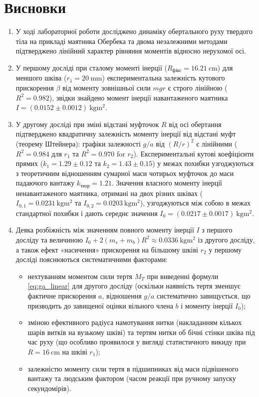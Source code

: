 \documentclass[ukrainian]{ucaphyslab}
\begin{document}
\section{Висновки}
\begin{enumerate}
  \item У ході лабораторної роботи досліджено динаміку обертального руху твердого тіла на прикладі маятника Обербека та двома незалежними методами підтверджено лінійний характер рівняння моментів відносно нерухомої осі.
  \item У першому досліді при сталому моменті інерції ($R_{\text{фікс}} = \SI{16.21}{\centi\meter}$) для меншого шківа ($r_1 = \SI{20}{\milli\meter}$) експериментальна залежність кутового прискорення $\beta$ від моменту зовнішньої сили $mgr$ є строго лінійною ($R^2 = 0.982$), звідки знайдено момент інерції навантаженого маятника $I = (\num{0.0152} \pm \num{0.0012})\ \si{\kilogram\meter\squared}$.
  \item У другому досліді при зміні відстані муфточок $R$ від осі обертання підтверджено квадратичну залежність моменту інерції від відстані муфт (теорему Штейнера): графіки залежності $g/a$ від $(R/r)^2$ є лінійними ($R^2 = 0.984$ для $r_1$ та $R^2 = 0.970$ for $r_2$). Експериментальні кутові коефіцієнти прямих ($k_1 = 1.29 \pm 0.12$ та $k_2 = 1.43 \pm 0.15$) у межах похибки узгоджуються з теоретичним відношенням сумарної маси чотирьох муфточок до маси падаючого вантажу $k_{\text{теор}} = 1.21$. Значення власного моменту інерції ненавантаженого маятника, отримані на двох різних шківах ($I_{0,1} = \SI{0.0231}{\kilogram\meter\squared}$ та $I_{0,2} = \SI{0.0203}{\kilogram\meter\squared}$), узгоджуються між собою в межах стандартної похибки і дають середнє значення $I_0 = (\num{0.0217} \pm \num{0.0017})\ \si{\kilogram\meter\squared}$.
  \item Деяка розбіжність між значенням повного моменту інерції $I$ з першого досліду та величиною $I_0 + 2(m_s+m_b)R^2 \approx \SI{0.0336}{\kilogram\meter\squared}$ із другого досліду, а також ефект «насичення» прискорення на більшому шківі $r_2$ у першому досліді пояснюються систематичними факторами:
  \begin{itemize}
    \item нехтуванням моментом сили тертя $M_T$ при виведенні формули \eqref{eq:ga_linear} для другого досліду (оскільки наявність тертя зменшує фактичне прискорення $a$, відношення $g/a$ систематично завищується, що призводить до завищеної оцінки вільного члена $b$ і моменту інерції $I_0$);
    \item зміною ефективного радіуса намотування нитки (накладанням кількох шарів витків на вузькому шківі) та тертям нитки об бічні стінки шківа під час руху (що особливо проявилося у вигляді статистичного викиду при $R = \SI{16}{\centi\meter}$ на шківі $r_1$);
    \item залежністю моменту сили тертя в підшипниках від маси підвішеного вантажу та людським фактором (часом реакції при ручному запуску секундомірів).
  \end{itemize}
\end{enumerate}
\end{document}
